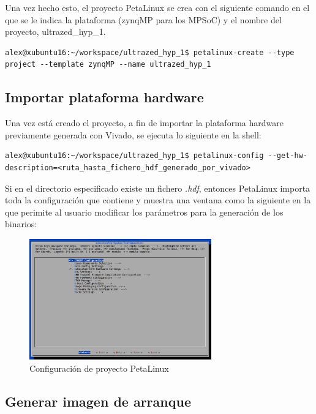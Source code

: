 Una vez hecho esto, el proyecto PetaLinux se crea con el siguiente comando en el que se le indica la plataforma (zynqMP para los MPSoC) y el nombre del proyecto, ultrazed\_hyp\_1.

\begin{lstlisting}[style=CStyle]
alex@xubuntu16:~/workspace/ultrazed_hyp_1$ petalinux-create --type project --template zynqMP --name ultrazed_hyp_1
\end{lstlisting}


\subsection{Importar plataforma hardware}

Una vez está creado el proyecto, a fin de importar la plataforma hardware previamente generada con Vivado, se ejecuta lo siguiente en la shell:

\begin{lstlisting}[style=CStyle]
alex@xubuntu16:~/workspace/ultrazed_hyp_1$ petalinux-config --get-hw-description=<ruta_hasta_fichero_hdf_generado_por_vivado>
\end{lstlisting}

Si en el directorio especificado existe un fichero \textit{.hdf}, entonces PetaLinux importa toda la configuración que contiene y muestra una ventana como la siguiente en la que perimite al usuario modificar los parámetros para la generación de los binarios:\\

\begin{figure}[!h]
	\centering
	\includegraphics[width=0.70\textwidth]{recursos/petalinux_config_1.png}
	\caption{Configuración de proyecto PetaLinux}
	\label{fig:petalinux_config_1}
\end{figure}



\subsection{Generar imagen de arranque}
